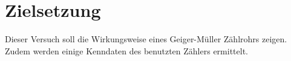 \section{Zielsetzung}
\label{sec:Zielsetzung}

Dieser Versuch soll die Wirkungsweise eines Geiger-Müller Zählrohrs zeigen.
Zudem werden einige Kenndaten des benutzten Zählers ermittelt.